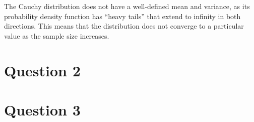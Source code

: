 \documentclass{article}
\begin{document}
The Cauchy distribution does not have a well-defined mean and variance,
as its probability density function has ``heavy tails'' that extend to
infinity in both directions. This means that the distribution does not
converge to a particular value as the sample size increases.

\section*{Question 2}

\newpage


\section*{Question 3}

\begin{Shaded}
\begin{Highlighting}[]
\SpecialCharTok{::}\SpecialCharTok{$}\NormalTok{(}\NormalTok{, }\NormalTok{, }\NormalTok{,}\NormalTok{, }\NormalTok{, }\NormalTok{)}


\OtherTok{\textless{}{-}} 
\OtherTok{\textless{}{-}} \NormalTok{(}\SpecialCharTok{*} \NormalTok{, } 
\OtherTok{\textless{}{-}}  \NormalTok{, }
\OtherTok{\textless{}{-}}\SpecialCharTok{+}\SpecialCharTok{\%*\%}\SpecialCharTok{+}
  \NormalTok{(}\NormalTok{(}
\NormalTok{\}}
\end{Highlighting}
\end{Shaded}
\end{document}
